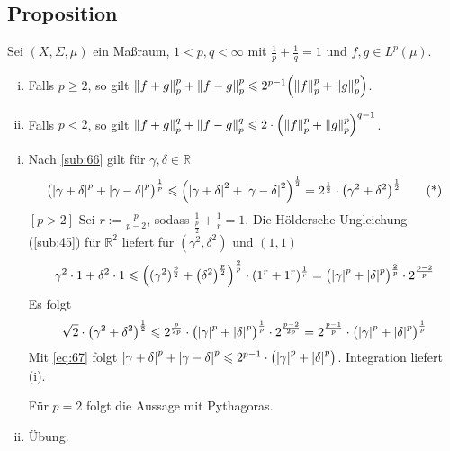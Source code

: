 \subsection{Proposition} %
\label{sub:67}
Sei $(X,\Sigma,\mu)$ ein Maßraum, $1 < p,q < \infty$ mit $\frac{1}{p} +\frac{1}{q}=1$ und $f,g \in L^p(\mu)$.
\begin{enumerate}[(i)]
	\item Falls $p\ge 2$, so gilt $\norm[p]{f+g}^p + \norm[p]{f-g}^p \le 2^{p-1} \enbrace*{\norm[p]{f}^p + \norm[p]{g}^p}$.
	\item Falls $p < 2$, so gilt $\norm[p]{f+g}^q + \norm[p]{f-g}^q \le 2 \cdot \enbrace*{\norm[p]{f}^p + \norm[p]{g}^p}^{q-1}$.
\end{enumerate}
\begin{enumerate}[(i)]
	\item Nach \ref{sub:66} gilt für $\gamma,\delta  \in \mathds{R}$
	\begin{equation*}
		\enbrace[\big]{\abs*{\gamma+\delta }^p + \abs*{\gamma-\delta }^p}^{\frac{1}{p}} \le \enbrace*{\abs*{\gamma+\delta }^2 + \abs*{\gamma-\delta}^2}^{\frac{1}{2}}
		= 2^{\frac{1}{2}} \cdot \enbrace*{\gamma^2 + \delta^2}^{\frac{1}{2}} \label{eq:67} \tag{*}
	\end{equation*}
	$[p>2]$ Sei $r := \frac{p}{p-2}$, sodass $\frac{1}{\frac{p}{2}} + \frac{1}{r}=1$. Die Höldersche Ungleichung (\ref{sub:45}) für $\mathds{R}^2$ liefert für 
	$(\gamma^2,\delta^2)$ und $(1,1)$
	\[
		\gamma^2 \cdot 1 + \delta^2 \cdot 1 \le \enbrace*{\enbrace{\gamma^2}^{\frac{p}{2} } + \enbrace*{\delta^2}^{\frac{p}{2}} }^{\frac{2}{p}} 
		\cdot (1^r+ 1^r)^{\frac{1}{r}} = \enbrace[\big]{\abs*{\gamma}^p + \abs*{\delta}^p}^{\frac{2}{p}} \cdot 2^{\frac{p-2}{p}} 
	\]
	Es folgt 
	\begin{align*}
		\sqrt{2} \cdot \enbrace*{\gamma^2+ \delta^2}^{\frac{1}{2}} \le 2^{\frac{p}{2p}} \cdot \enbrace[\big]{\abs*{\gamma}^p + \abs*{\delta }^p}^{\frac{1}{p}} \cdot 2^{\frac{p-2}{2p} } = 2^{\frac{p-1}{p}} \cdot \enbrace[\big]{\abs*{\gamma}^p +\abs*{\delta}^p}^{\frac{1}{p} } 
	\end{align*}
	Mit \eqref{eq:67} folgt $\abs*{\gamma+\delta}^p + \abs*{\gamma-\delta}^p \le 2^{p-1} \cdot  \enbrace[\big]{\abs*{\gamma}^p + \abs*{\delta}^p}$. Integration liefert (i).
	
	Für $p=2$ folgt die Aussage mit Pythagoras.
	\item Übung. \bewende
\end{enumerate}


